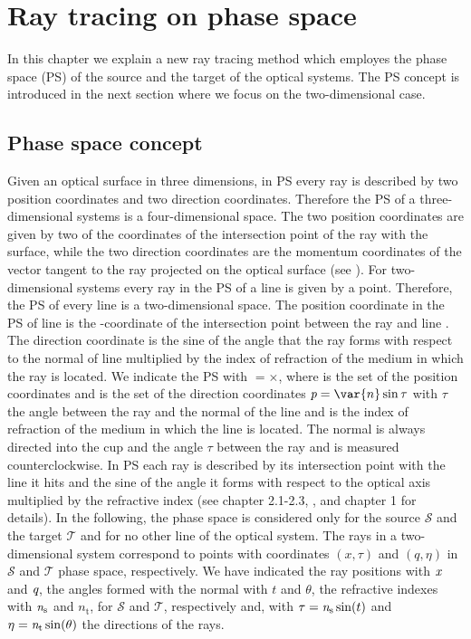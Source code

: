 \chapter{Ray tracing on phase space} \label{chap:PS}
In this chapter we explain a new ray tracing method which employes the phase space (PS) of the source and the target of the optical systems.
The PS concept is introduced in the next section where we focus on the two-dimensional case.
\section{Phase space concept}
Given an optical surface in three dimensions, in PS every ray is described by two position coordinates
and two direction coordinates. Therefore the PS of a three-dimensional systems is a four-dimensional space.
The two position coordinates are given by two of the coordinates of the intersection point of the ray with the surface, while the two direction coordinates are
the momentum coordinates of the vector tangent to the ray projected on the optical surface (see \cite{Wolf}).
For two-dimensional systems every ray in the PS of a line is given by a point. Therefore, the PS of every line is a two-dimensional space.
The position coordinate in the PS of line \lineai is the -coordinate of the intersection point between the ray and line \lineai.
The direction coordinate is the sine of the angle that the ray forms with respect to the normal of line \lineai multiplied by the index of refraction of the medium in which the ray is located.
We indicate the PS with $=$$\times$,
where  is the set of the position coordinates  and  is the set of the direction coordinates $\variabile{p}=\var{n}\sin{\tau}$ with $\tau$ the angle between the ray and the normal \vect{$\boldsymbol{\nu}$} of the line and  is the index of refraction of the medium in which the line is located.  
The normal \vect{$\boldsymbol{\nu}$} is always directed into the cup and the angle $\tau$ between the ray and \vect{$\boldsymbol{\nu}$} is measured counterclockwise.
In PS each ray is described by its intersection point with the line it hits and the sine of the angle it forms with respect to the optical axis multiplied by the refractive index (see \cite{wolf2004geometric} chapter 2.1-2.3, \cite{rausch2014phase}, and \cite{torre2005linear} chapter 1 for details).
In the following, the phase space is considered only for the source $\mathcal{S}$ and the target $\mathcal{T}$ and for no other line of the optical system.
The rays in a two-dimensional system correspond to points with coordinates $(x,\tau)$ and $(q,\eta)$ in $\mathcal{S}$ and $\mathcal{T}$ phase space, respectively.
We have indicated the ray positions with $\textit{x}$ and $\textit{q}$, the angles formed with the normal with $t$ and $\theta$, the refractive indexes with $\textit{n}_{\textrm{s}}$ and $n_{\textrm{t}}$, for $\mathcal{S}$ and $\mathcal{T}$, respectively and, with $\tau = \textit{n}_{\textrm{s}}\sin(t)$ and $\eta = \textit{n}_{\textrm{t}}\sin(\theta)$ the directions of the rays.

